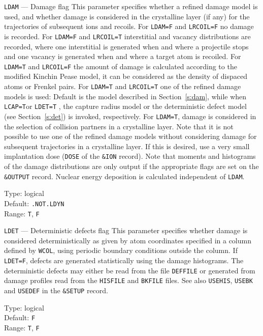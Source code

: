 \begin{keydescription}{\texttt{LDAM} --- Damage flag}
%
  This parameter specifies whether a refined damage model is used, and whether
  damage is considered in the crystalline layer (if any) for the trajectories 
  of subsequent ions and recoils.  For \texttt{LDAM=F} and \texttt{LRCOIL=F}
  no damage is recorded. For \texttt{LDAM=F} and \texttt{LRCOIL=T} interstitial 
  and vacancy distributions are recorded, where one interstitial is generated 
  when and where a projectile stops and one vacancy is generated when and where
  a target atom is recoiled. For \texttt{LDAM=T} and \texttt{LRCOIL=F} the 
  amount of damage is calculated according to the modified Kinchin Pease model, 
  it can be considered as the density of dispaced atoms or Frenkel pairs. For 
  \texttt{LDAM=T} and \texttt{LRCOIL=T} one of the refined damage models is
  used: Default is the model described in Section~\ref{s:dam}, while when
  \texttt{LCAP=T}\ifprivate or \texttt{LDET=T} \fi, the capture radius model
  \ifprivate or the deterministic defect model (see Section~\ref{s:det}) \fi
  is invoked\ifprivate, respectively\fi. For \texttt{LDAM=T}, damage is
  considered in the selection of collision partners in a crystalline layer.  Note that it is not possible to 
  use one of the refined damage models without considering damage for
  subsequent trajectories in a crystalline layer. If this is desired, use a
  very small implantation dose (\texttt{DOSE} of the \texttt{\&ION} record).
  Note that moments and histograms of the damage distributions are only output
  if the appropriate flags are set on the \texttt{\&OUTPUT} record.  Nuclear
  energy deposition is calculated independent of \texttt{LDAM}.
  \begin{keytab}
    Type:    \> logical \\
    Default: \> \texttt{.NOT.LDYN} \\
    Range:   \> \texttt{T}, \texttt{F}
  \end{keytab}
\end{keydescription}

\ifprivate
\begin{keydescription}{\texttt{LDET} --- Deterministic defects flag}
%
  This parameter specifies whether damage is considered deterministically as
  given by atom coordinates specified in a column defined by \texttt{WCOL},
  using periodic boundary conditions outside the column.  If \texttt{LDET=F},
  defects are generated statistically using the damage histograms.  The
  deterministic defects may either be read from the file \texttt{DEFFILE} or
  generated from damage profiles read from the \texttt{HISFILE} and
  \texttt{BKFILE} files. See also \texttt{USEHIS}, \texttt{USEBK} and
  \texttt{USEDEF} in the \texttt{\&SETUP} record.
  \begin{keytab}
    Type:    \> logical \\
    Default: \> \texttt{F} \\
    Range:   \> \texttt{T}, \texttt{F}
  \end{keytab}
\end{keydescription}

